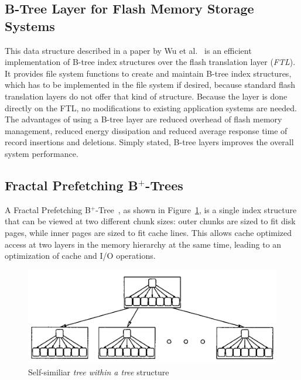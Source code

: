 \documentclass{acm_proc_article-sp}
\begin{document}
\subsection{B-Tree Layer for Flash Memory Storage Systems}
This data structure described in a paper by Wu et al.~\cite{wu2007efficient} is an efficient implementation of B-tree index structures over the flash translation layer (\emph{FTL}). It provides file system functions to create and maintain B-tree index structures, which has to be implemented in the file system if desired, because standard flash translation layers do not offer that kind of structure. Because the layer is done directly on the FTL, no modifications to existing application systems are needed. The advantages of using a B-tree layer are reduced overhead of flash memory management, reduced energy dissipation and reduced average response time of record insertions and deletions. Simply stated, B-tree layers improves the overall system performance.

\subsection{Fractal Prefetching B$^{+}$-Trees}
A Fractal Prefetching B$^{+}$-Tree~\cite{chen2002fractal}, as shown in Figure~\ref{fig:b-tree}, is a single index structure that can be viewed at two different chunk sizes: outer chunks are sized to fit disk pages, while inner pages are sized to fit cache lines. This allows cache optimized access at two layers in the memory hierarchy at the same time, leading to an optimization of cache and I/O operations.

\begin{figure}[ht]
\centering
\includegraphics[width=\columnwidth]{b-tree.png}
\caption{Self-similiar \emph{tree within a tree} structure~\cite{chen2002fractal}}
\label{fig:b-tree}
\end{figure}
\end{document}
